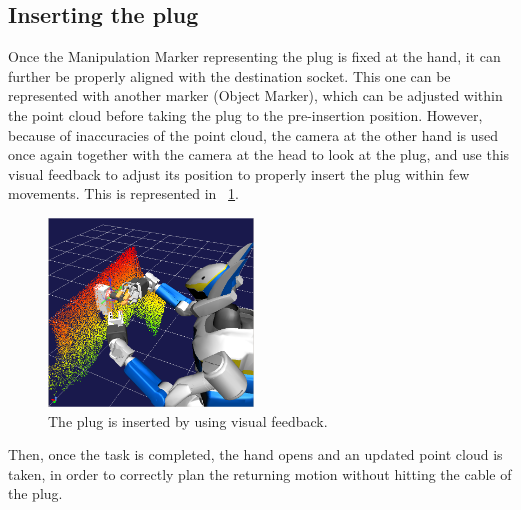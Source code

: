 	\subsection{Inserting the plug}
		
		Once the Manipulation Marker representing the plug is fixed at the hand, it can further be properly
		aligned with the destination socket.
		This one can be represented with another marker (Object Marker), which can be adjusted within the
		point cloud before taking the plug to the pre-insertion position.
		However, because of inaccuracies of the point cloud, the camera at the other hand is used once again
		together with the camera at the head to look at the plug, and use this visual feedback to adjust its
		position to properly insert the plug within few movements.
		This is represented in \figurename~\ref{fig:InsertPlug}.
		
		\begin{figure}[b]
			\centering
			\includegraphics[height = 5cm]{img/InsertPlug}
			\caption{The plug is inserted by using visual feedback.}
			\label{fig:InsertPlug}
		\end{figure}
		
		Then, once the task is completed, the hand opens and an updated point cloud is taken, in order to
		correctly plan the returning motion without hitting the cable of the plug.